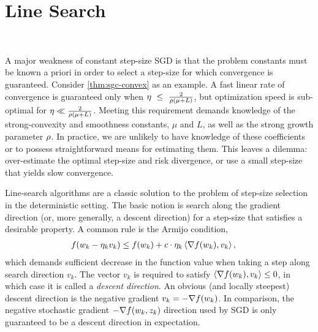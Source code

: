 
\chapter{Line Search}~\label{ch:line-search}

A major weakness of constant step-size \ac{SGD} is that the problem constants must be known a priori in order to select a step-size for which convergence is guaranteed.
Consider \autoref{thm:sgc-convex} as an example. 
A fast linear rate of convergence is guaranteed only when \( \eta~\leq~\frac{2}{\rho\left(\mu + L\right)} \), but optimization speed is sub-optimal for \( \eta \ll \frac{2}{\rho\left(\mu + L\right)} \).
Meeting this requirement demands knowledge of the strong-convexity and smoothness constants, \( \mu \) and \( L \), as well as the strong growth parameter \( \rho \).
In practice, we are unlikely to have knowledge of these coefficients or to possess straightforward means for estimating them.
This leaves a dilemma: over-estimate the optimal step-size and risk divergence, or use a small step-size that yields slow convergence. 

Line-search algorithms are a classic solution to the problem of step-size selection in the deterministic setting.
The basic notion is search along the gradient direction (or, more generally, a descent direction) for a step-size that satisfies a desirable property.
A common rule is the Armijo condition, 
 \begin{align}
     f(w_k - \eta_k v_k) &\leq f(w_k) + c \cdot \eta_k \left\langle\nabla f(w_k), v_k\right\rangle,~\label{eq:deterministic-armijo-ls}
\end{align}
which demands sufficient decrease in the function value when taking a step along search direction \( v_k \).
The vector \( v_k \) is required to satisfy \( \left\langle\nabla f(w_k), v_k\right\rangle \leq 0 \), in which case it is called a \emph{descent direction}.
An obvious (and locally steepest) descent direction is the negative gradient \( v_k = - \nabla f(w_k) \). 
In comparison, the negative stochastic gradient \( - \nabla f(w_k, z_{k}) \) direction used by \ac{SGD} is only guaranteed to be a descent direction in expectation.


